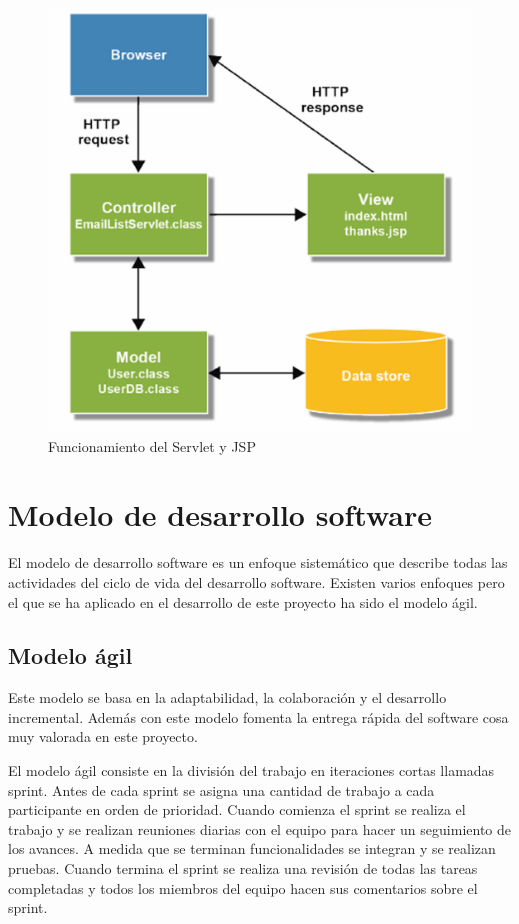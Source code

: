 \begin{figure}[H]
    \centering
    \includegraphics[width=0.65\linewidth]{img/servlet.jpg}
    \caption{Funcionamiento del Servlet y JSP}
    \label{fig:diagrama-jsp}
\end{figure}
    
\section{Modelo de desarrollo software}
El modelo de desarrollo software es un enfoque sistemático que describe todas las actividades del ciclo de vida del desarrollo software. Existen varios enfoques \cite{modelo-desarrollo} pero el que se ha aplicado en el desarrollo de este proyecto ha sido el modelo ágil.

\subsection{Modelo ágil}
Este modelo se basa en la adaptabilidad, la colaboración y el desarrollo incremental. Además con este modelo fomenta la entrega rápida del software cosa muy valorada en este proyecto.

El modelo ágil consiste en la división del trabajo en iteraciones cortas llamadas sprint. Antes de cada sprint se asigna una cantidad de trabajo a cada participante en orden de prioridad. Cuando comienza el sprint se realiza el trabajo y se realizan reuniones diarias con el equipo para hacer un seguimiento de los avances. A medida que se terminan funcionalidades se integran y se realizan pruebas. Cuando termina el sprint se realiza una revisión de todas las tareas completadas y todos los miembros del equipo hacen sus comentarios sobre el sprint. 

